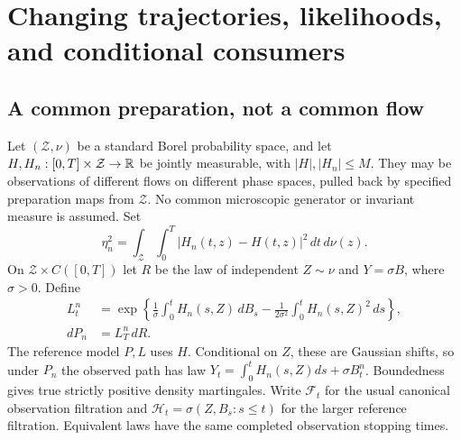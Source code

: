 \section{Changing trajectories, likelihoods, and conditional consumers}
\label{sec:v18-transport}
\subsection{A common preparation, not a common flow}
Let $(\mathcal Z,\nu)$ be a standard Borel probability space, and let
$H,H_n:[0,T]\times\mathcal Z\to\mathbb R$ be jointly measurable, with
$|H|,|H_n|\le M$. They may be observations of different flows on different
phase spaces, pulled back by specified preparation maps from $\mathcal Z$.
No common microscopic generator or invariant measure is assumed. Set
\[
 \eta_n^2=\int_{\mathcal Z}\int_0^T|H_n(t,z)-H(t,z)|^2\,dt\,d\nu(z).
\]
On $\mathcal Z\times C([0,T])$ let $R$ be the law of independent $Z\sim\nu$
and $Y=\sigma B$, where $\sigma>0$. Define
\begin{align}
 L_t^n&=\exp\left\{\frac1\sigma\int_0^t H_n(s,Z)\,dB_s
                   -\frac1{2\sigma^2}\int_0^t H_n(s,Z)^2\,ds\right\},
                  \label{eq:v18-likelihood}\\
 dP_n&=L_T^n\,dR.
\end{align}
The reference model $P,L$ uses $H$. Conditional on $Z$, these are Gaussian
shifts, so under $P_n$ the observed path has law
$Y_t=\int_0^tH_n(s,Z)ds+\sigma B_t^n$. Boundedness gives true strictly
positive density martingales. Write $\mathcal F_t$ for the usual canonical
observation filtration and $\mathcal H_t=\sigma(Z,B_s:s\le t)$ for the
larger reference filtration. Equivalent laws have the same completed
observation stopping times.

